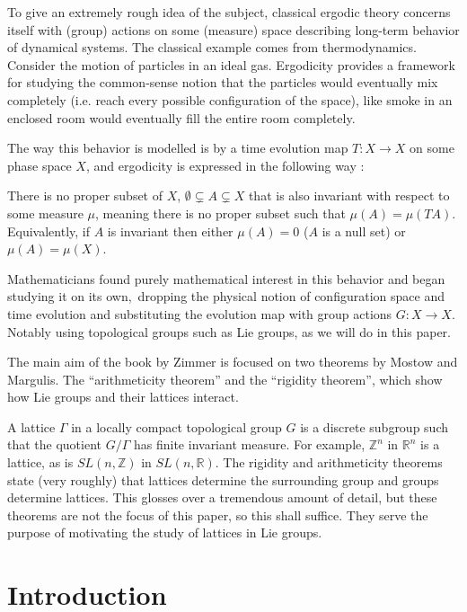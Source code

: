\documentclass[
  12pt
]{article}
\theoremstyle{plain}
\newcommand{\G}{\ensuremath{G}\xspace}
\newcommand{\Gamm}{\ensuremath{\Gamma}\xspace}
\newcommand{\bbr}{\ensuremath{\mathbb{R}}\xspace}
\newcommand{\slnr}{\ensuremath{SL(n, \mathbb{R})}\xspace}
\begin{document}
  To give an extremely rough idea of the subject, classical ergodic theory concerns itself with (group) actions on some (measure) space
  describing long-term behavior of dynamical systems.
  The classical example comes from thermodynamics. Consider the motion of particles in an ideal gas.
  Ergodicity provides a framework for studying the common-sense notion that the particles would eventually mix completely (i.e. reach every possible configuration of the space),
  like smoke in an enclosed room would eventually fill the entire room completely.

  The way this behavior is modelled is by a time evolution map $T:X \rightarrow X$ on some phase space $X$,
  and ergodicity is expressed in the following way :

  There is no proper subset of $X$, $\emptyset \subsetneq A \subsetneq X$ that is also invariant with respect to some measure $\mu$,
  meaning there is no proper subset such that $\mu(A) = \mu(TA)$.
  Equivalently, if $A$ is invariant then either $\mu(A) =0$ ($A$ is a null set) or $\mu(A) = \mu(X)$.

  Mathematicians found purely mathematical interest in this behavior and began studying it on its own,\
  dropping the physical notion of configuration space and time evolution and substituting the evolution map with group actions $G:X \rightarrow X$.
  Notably using topological groups such as Lie groups, as we will do in this paper.

  The main aim of the book by Zimmer is focused on two theorems by Mostow and
  Margulis. The ``arithmeticity theorem'' and the ``rigidity theorem'', which
  show how Lie groups and their lattices interact. 

  A lattice \Gamm in a locally compact topological group \G is a discrete subgroup such that the quotient $G/\Gamma$ has finite invariant measure.
  For example, $\mathbb{Z}^n$ in $\bbr^n$ is a lattice, as is $SL(n, \mathbb{Z})$ in $\slnr$.
  The rigidity and arithmeticity theorems state (very roughly) that lattices determine the surrounding group and groups determine lattices.
  This glosses over a tremendous amount of detail, but these theorems are not the focus of this paper, so this shall suffice.
  They serve the purpose of motivating the study of lattices in Lie groups.





\hypertarget{introduction}{\section{Introduction}\label{sec:introduction}}
\end{document}
